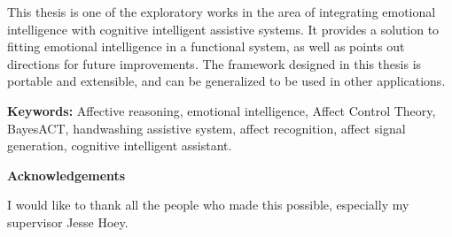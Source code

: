 This thesis is one of the exploratory works in the area of integrating emotional intelligence with cognitive intelligent assistive systems. It provides a solution to fitting emotional intelligence in a functional system, as well as points out directions for future improvements. The framework designed in this thesis is portable and extensible, and can be generalized to be used in other applications.

\vskip 1cm
\noindent\textbf{Keywords:} Affective reasoning, emotional intelligence, Affect Control Theory, BayesACT, handwashing assistive system, affect recognition, affect signal generation, cognitive intelligent assistant.

\cleardoublepage


\begin{center}\textbf{Acknowledgements}\end{center}

I would like to thank all the people who made this possible, especially my supervisor Jesse Hoey.

\cleardoublepage



\renewcommand\contentsname{Table of Contents}
\tableofcontents
\cleardoublepage
{}

\listoftables
\cleardoublepage
{}		%

\listoffigures
\cleardoublepage
{}		%



